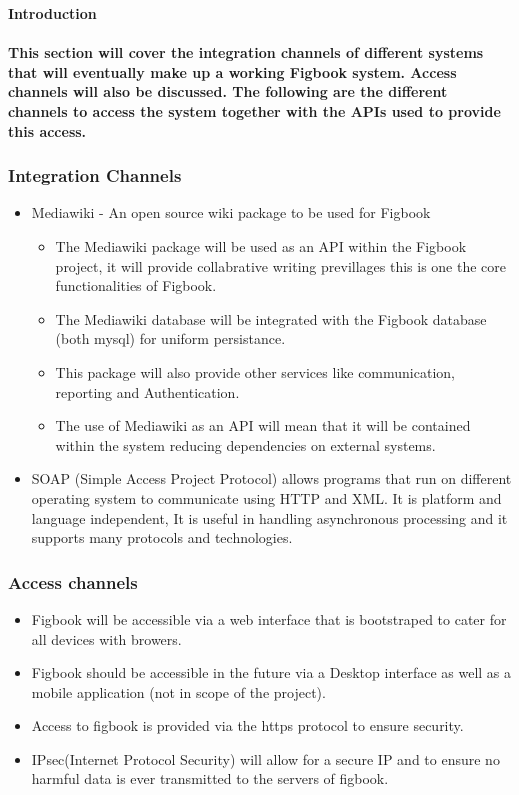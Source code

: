 

\textbf{Introduction}\paragraph{This section will cover the integration channels of different systems that will eventually make up a working Figbook system.
Access channels will also be discussed. The following are the different channels to access the system together with the APIs used to provide this access. } 

\subsubsection{Integration Channels}
\begin{itemize}
\item Mediawiki - An open source wiki package to be used for Figbook
\begin{itemize}
\item The Mediawiki package will be used as an API within the Figbook project, it will provide collabrative writing previllages this is one the core functionalities of Figbook.
\item The Mediawiki database will be integrated with the Figbook database (both mysql) for uniform persistance.
\item This package will also provide other services like communication, reporting and Authentication.
\item The use of Mediawiki as an API will mean that it will be contained within the system reducing dependencies on external systems.
\end{itemize}
\item SOAP (Simple Access Project Protocol) allows programs that run on different operating system to communicate using HTTP and XML. It is platform and language independent, It is useful in handling asynchronous processing and it supports many protocols and technologies.
\end{itemize}
\subsubsection{Access channels}
\begin{itemize}
\item Figbook will be accessible via a web interface that is bootstraped to cater for all devices with browers.
\item Figbook should be accessible in the future via a Desktop interface as well as a mobile application (not in scope of the project).
\item Access to figbook is provided via the https protocol to ensure security.
\item IPsec(Internet Protocol Security) will allow for a secure IP and to ensure no harmful data is ever transmitted to the servers of figbook.
\end{itemize}

